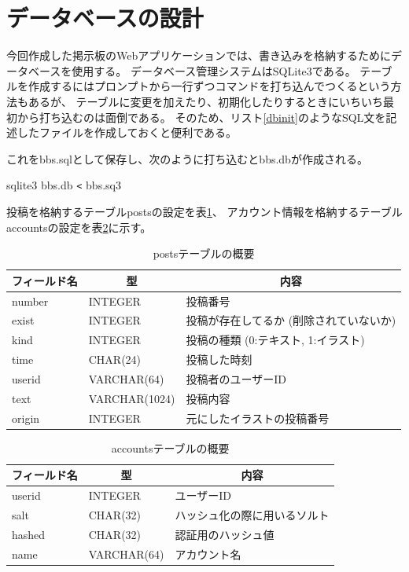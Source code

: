 \documentclass[a4j,titlepage]{jsarticle}
\newcommand{\chuo}[1]{\multicolumn{1}{|c|}{#1}}
\begin{document}
\section{データベースの設計}
今回作成した掲示板のWebアプリケーションでは、書き込みを格納するためにデータベースを使用する。
データベース管理システムはSQLite3である。
テーブルを作成するにはプロンプトから一行ずつコマンドを打ち込んでつくるという方法もあるが、
テーブルに変更を加えたり、初期化したりするときにいちいち最初から打ち込むのは面倒である。
そのため、リスト\ref{dbinit}のようなSQL文を記述したファイルを作成しておくと便利である。



これをbbs.sqlとして保存し、次のように打ち込むとbbs.dbが作成される。

\begin{mdframed}
  sqlite3 bbs.db \verb|<| bbs.sq3
\end{mdframed}

投稿を格納するテーブルpostsの設定を表\ref{writings}、
アカウント情報を格納するテーブルaccountsの設定を表\ref{accounts}に示す。

\begin{table}[h]
  \centering
  \caption{postsテーブルの概要}
  \label{writings}
  \begin{tabular}{|l|l|l|}
    \hline
    \chuo{フィールド名} & \chuo{型} & \chuo{内容} \\ \hline \hline
    number & INTEGER & 投稿番号 \\ \hline
    exist  & INTEGER & 投稿が存在してるか (削除されていないか) \\ \hline
    kind   & INTEGER & 投稿の種類 (0:テキスト, 1:イラスト) \\ \hline
    time   & CHAR(24) & 投稿した時刻     \\ \hline
    userid & VARCHAR(64) & 投稿者のユーザーID \\ \hline
    text   & VARCHAR(1024) & 投稿内容   \\ \hline
    origin & INTEGER & 元にしたイラストの投稿番号  \\ \hline
  \end{tabular}
\end{table}

\begin{table}[h]
  \centering
  \caption{accountsテーブルの概要}
  \label{accounts}
  \begin{tabular}{|l|l|l|}
    \hline
    \chuo{フィールド名} & \chuo{型} & \chuo{内容} \\ \hline \hline
    userid & INTEGER    & ユーザーID \\ \hline
    salt & CHAR(32)   & ハッシュ化の際に用いるソルト     \\ \hline
    hashed & CHAR(32) & 認証用のハッシュ値     \\ \hline
    name & VARCHAR(64)      & アカウント名     \\ \hline
  \end{tabular}
\end{table}
\end{document}
